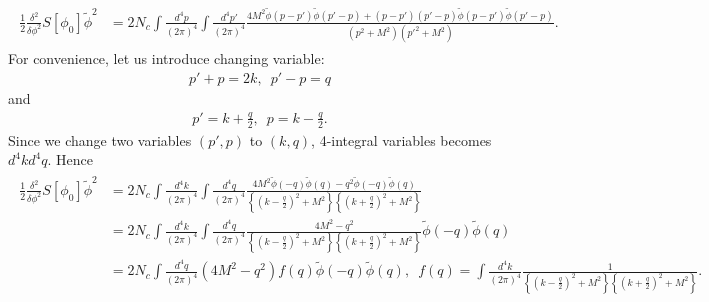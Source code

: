 \documentclass[tightenlines,floatfix,nofootinbib,superscriptaddress,fleqn]{revtex4-2}
\begin{document}
\begin{align}
  \begin{split}
    \frac{1}{2}\frac{\delta^2}{\delta\phi^2}S[\phi_0]\tilde{\phi}^2
    &=2N_c\int\frac{d^4p}{(2\pi)^4}\int\frac{d^4p'}{(2\pi)^4}
    \frac{4M^2\tilde{\phi}(p-p')
    \tilde{\phi}(p'-p)
  +(p-p')(p'-p)\tilde{\phi}(p-p')
   \tilde{\phi}(p'-p)}{(p^2+M^2)(p'^2+M^2)}.
  \end{split}
\end{align}
For convenience, let us introduce changing variable:
\begin{align}
  p'+p=2k,\,\,\,p'-p=q
\end{align}
and
\begin{align}
  p'=k+\frac{q}{2},\,\,\, p =k-\frac{q}{2}.
\end{align}
Since we change two variables $(p',p)$ to $(k,q)$, 4-integral variables becomes
$d^4kd^4q$. Hence 
\begin{align}
  \begin{split}
    \frac{1}{2}\frac{\delta^2}{\delta\phi^2}S[\phi_0]\tilde{\phi}^2
    &=2N_c\int\frac{d^4k}{(2\pi)^4}\int\frac{d^4q}{(2\pi)^4}
    \frac{4M^2\tilde{\phi}(-q)
    \tilde{\phi}(q)
  -q^2\tilde{\phi}(-q)
   \tilde{\phi}(q)}{\left\{\left(k-\frac{q}{2}\right)^2+M^2\right\}
   \left\{\left(k+\frac{q}{2}\right)^2+M^2\right\}} \\
   &=2N_c\int\frac{d^4k}{(2\pi)^4}\int\frac{d^4q}{(2\pi)^4}
    \frac{4M^2-q^2}{\left\{\left(k-\frac{q}{2}\right)^2+M^2\right\}
   \left\{\left(k+\frac{q}{2}\right)^2+M^2\right\}}\tilde{\phi}(-q)
   \tilde{\phi}(q)  \\
   &= 2N_c\int\frac{d^4q}{(2\pi)^4}
   (4M^2-q^2)f(q)\tilde{\phi}(-q)\tilde{\phi}(q),\,\,\,
   f(q) = \int\frac{d^4k}{(2\pi)^4}\frac{1}
   {\left\{\left(k-\frac{q}{2}\right)^2+M^2\right\}
   \left\{\left(k+\frac{q}{2}\right)^2+M^2\right\}}.
  \end{split}
\end{align}
\end{document}
